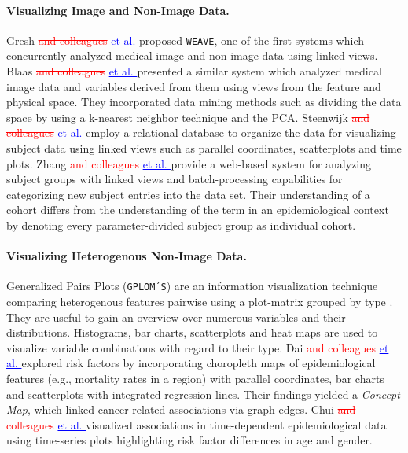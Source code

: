 \documentclass[journal]{style/vgtc} 			          %
\newcommand{\rem}[1]{\textcolor{red}{\sout{#1}}}
\newcommand{\add}[1]{\textcolor{blue}{\uline{#1}}}
\begin{document}
\paragraph{Visualizing Image and Non-Image Data. }
Gresh \rem{and colleagues} \add{et al. \cite{Gresh2000}} proposed \texttt{WEAVE}, one of the first systems which concurrently analyzed medical image and non-image data using linked views.
%
Blaas \rem{and colleagues} \add{et al. \cite{Blaas2007}} presented a similar system which analyzed medical image data and variables derived from them using views from the feature and physical space.
%
They incorporated data mining methods such as dividing the data space by using a k-nearest neighbor technique and the PCA.
%
Steenwijk \rem{and colleagues} \add{et al. \cite{Steenwijk2010}} employ a relational database to organize the data for visualizing subject data using linked views such as parallel coordinates, scatterplots and time plots.
%
Zhang \rem{and colleagues} \add{et al. \cite{Zhang2012}} provide a web-based system for analyzing subject groups with linked views and batch-processing capabilities for categorizing new subject entries into the data set.
%
Their understanding of a cohort differs from the understanding of the term in an epidemiological context by denoting every parameter-divided subject group as individual cohort.

\paragraph{Visualizing Heterogenous Non-Image Data.}
Generalized Pairs Plots (\texttt{GPLOM´S}) are an information visualization technique comparing heterogenous features pairwise using a plot-matrix grouped by type \cite{Francois2013}.
%
They are useful to gain an overview over numerous variables and their distributions.
%
Histograms, bar charts, scatterplots and heat maps are used to visualize variable combinations with regard to their type.
%
%
%
%
Dai \rem{and colleagues} \add{et al. \cite{Dai2005}} explored risk factors by incorporating choropleth maps of epidemiological features (e.g., mortality rates in a region) with parallel coordinates, bar charts and scatterplots with integrated regression lines.
%
Their findings yielded a \emph{Concept Map}, which linked cancer-related associations via graph edges.
%
Chui \rem{and colleagues} \add{et al. \cite{Chui2011}} visualized associations in time-dependent epidemiological data using time-series plots highlighting risk factor differences in age and gender.
\end{document}
